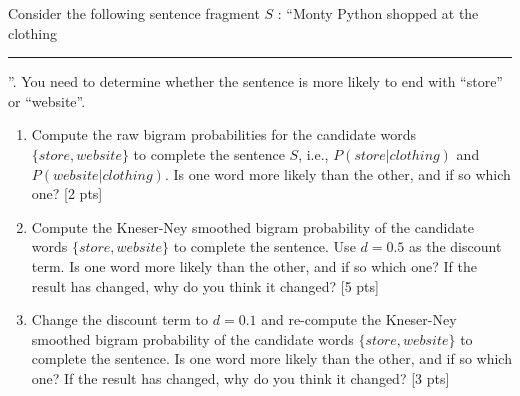 \documentclass[twoside,10pt]{article}
\begin{document}
Consider the following sentence fragment $S$ : “Monty Python shopped at the clothing  \rule{1cm}{0.15mm}”. You need to determine whether the sentence is more likely to end with ``store'' or ``website''.

\begin{enumerate}[label=(\alph*)]
    \item Compute the raw bigram probabilities for the candidate words $\{store, website\}$ to complete the sentence $S$, i.e., $P(store|clothing)$ and $P(website|clothing)$. Is one word more likely than the other, and if so which one? [2 pts]
    \item Compute the Kneser-Ney smoothed bigram probability of the candidate words $\{store, website\}$ to complete the sentence. Use $d = 0.5$ as the discount term. Is one word more likely than the other, and if so which one? If the result has changed, why do you think it changed? [5 pts]
    \item Change the discount term to $d = 0.1$ and re-compute the Kneser-Ney smoothed bigram probability of the candidate words $\{store, website \}$ to complete the sentence. Is one word more likely than the other, and if so which one? If the result has changed, why do you think it changed? [3 pts]
\end{enumerate}










\end{document}
